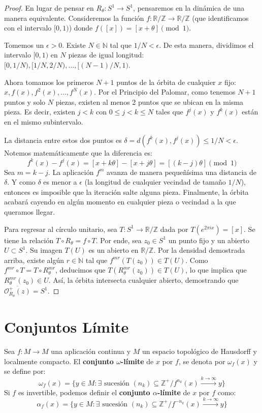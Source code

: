 \begin{proof}
	En lugar de pensar en $R_\theta: S^1 \to S^1$, pensaremos en la dinámica de una manera equivalente. Consideremos la función $f: \mathbb{R}/\mathbb{Z} \to \mathbb{R}/\mathbb{Z}$ (que identificamos con el intervalo $[0,1)$) donde $f([x]) = [x+\theta] \pmod 1$.
	
	Tomemos un $\epsilon > 0$. Existe $N \in \mathbb{N}$ tal que $1/N < \epsilon$. De esta manera, dividimos el intervalo $[0,1)$ en $N$ piezas de igual longitud: $[0, 1/N), [1/N, 2/N), \dots, [(N-1)/N, 1)$.
	
	Ahora tomamos los primeros $N+1$ puntos de la órbita de cualquier $x$ fijo: $x, f(x), f^2(x), \dots, f^N(x)$. Por el Principio del Palomar, como tenemos $N+1$ puntos y solo $N$ piezas, existen al menos 2 puntos que se ubican en la misma pieza. Es decir, existen $j < k$ con $0 \le j < k \le N$ tales que $f^j(x)$ y $f^k(x)$ están en el mismo subintervalo.
	
	La distancia entre estos dos puntos es $\delta = d(f^k(x), f^j(x)) \le 1/N < \epsilon$. Notemos matemáticamente que la diferencia es:
	$$f^k(x) - f^j(x) = [x+k\theta] - [x+j\theta] = [(k-j)\theta] \pmod 1$$
	Sea $m = k-j$. La aplicación $f^m$ avanza de manera pequeñísima una distancia de $\delta$. Y como $\delta$ es menor a $\epsilon$ (la longitud de cualquier vecindad de tamaño $1/N$), entonces es imposible que la iteración salte alguna pieza. Finalmente, la órbita acabará cayendo en algún momento en cualquier pieza o vecindad a la que queramos llegar.
	
	Para regresar al círculo unitario, sea $T: S^1 \to \mathbb{R}/\mathbb{Z}$ dada por $T(e^{2\pi i x}) = [x]$. Se tiene la relación $T \circ R_\theta = f \circ T$. 
	Por ende, sea $z_0 \in S^1$ un punto fijo y un abierto $U \subset S^1$. Su imagen $T(U)$ es un abierto en $\mathbb{R}/\mathbb{Z}$. Por la densidad demostrada arriba, existe algún $r \in \mathbb{N}$ tal que $f^{mr}(T(z_0)) \in T(U)$. 
	Como $f^{mr} \circ T = T \circ R_\theta^{mr}$, deducimos que $T(R_\theta^{mr}(z_0)) \in T(U)$, lo que implica que $R_\theta^{mr}(z_0) \in U$. Así, la órbita intersecta cualquier abierto, demostrando que $\overline{\mathcal{O}^+_{R_\theta}(z)} = S^1$.
\end{proof}

\section{Conjuntos Límite}

\begin{definicion}
	Sea $f: M \to M$ una aplicación continua y $M$ un espacio topológico de Hausdorff y localmente compacto. El \textbf{conjunto $\omega$-límite} de $x$ por $f$, se denota por $\omega_f(x)$ y se define por:
	$$\omega_f(x) = \{y \in M : \exists \text{ sucesión } (n_k) \subseteq \mathbb{Z}^+ / f^{n_k}(x) \xrightarrow{k \to \infty} y\}$$
	Si $f$ es invertible, podemos definir el \textbf{conjunto $\alpha$-límite} de $x$ por $f$ como:
	$$\alpha_f(x) = \{y \in M : \exists \text{ sucesión } (n_k) \subseteq \mathbb{Z}^+ / f^{-n_k}(x) \xrightarrow{k \to \infty} y\}$$
\end{definicion}

